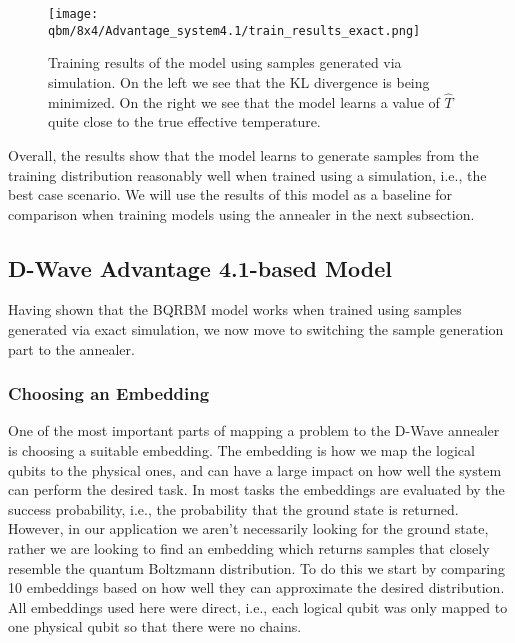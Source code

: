 \begin{figure}[!htb]
    \begin{center}
        \texttt{[image: qbm/8x4/Advantage\_system4.1/train\_results\_exact.png]}
    \end{center}
    \caption{Training results of the model using samples generated via simulation. On the left we see that the KL divergence is being minimized. On the right we see that the model learns a value of \( \hat{T} \) quite close to the true effective temperature.}
    \label{fig:train_results_exact}
\end{figure}

Overall, the results show that the model learns to generate samples from the training distribution reasonably well when trained using a simulation, i.e., the best case scenario.
We will use the results of this model as a baseline for comparison when training models using the annealer in the next subsection.

\subsection{D-Wave Advantage 4.1-based Model}
Having shown that the BQRBM model works when trained using samples generated via exact simulation, we now move to switching the sample generation part to the annealer.

\subsubsection{Choosing an Embedding}
One of the most important parts of mapping a problem to the D-Wave annealer is choosing a suitable embedding.
The embedding is how we map the logical qubits to the physical ones, and can have a large impact on how well the system can perform the desired task.
In most tasks the embeddings are evaluated by the success probability, i.e., the probability that the ground state is returned.
However, in our application we aren't necessarily looking for the ground state, rather we are looking to find an embedding which returns samples that closely resemble the quantum Boltzmann distribution.
To do this we start by comparing 10 embeddings based on how well they can approximate the desired distribution.
All embeddings used here were direct, i.e., each logical qubit was only mapped to one physical qubit so that there were no chains.

